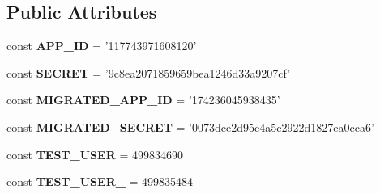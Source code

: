 \subsection*{Public Attributes}
\begin{DoxyCompactItemize}
\item 
\hypertarget{classPHPSDKTestCase_a42953a934e7fe71b3071c2776d9df949}{const {\bfseries A\-P\-P\-\_\-\-I\-D} = '117743971608120'}\label{classPHPSDKTestCase_a42953a934e7fe71b3071c2776d9df949}

\item 
\hypertarget{classPHPSDKTestCase_a2e31ccc7c2b15ed269966d301045f040}{const {\bfseries S\-E\-C\-R\-E\-T} = '9c8ea2071859659bea1246d33a9207cf'}\label{classPHPSDKTestCase_a2e31ccc7c2b15ed269966d301045f040}

\item 
\hypertarget{classPHPSDKTestCase_aeec98b2a076ae4d7022eb3c4eb955992}{const {\bfseries M\-I\-G\-R\-A\-T\-E\-D\-\_\-\-A\-P\-P\-\_\-\-I\-D} = '174236045938435'}\label{classPHPSDKTestCase_aeec98b2a076ae4d7022eb3c4eb955992}

\item 
\hypertarget{classPHPSDKTestCase_ae8b651bf891ad8f60089036e736fe273}{const {\bfseries M\-I\-G\-R\-A\-T\-E\-D\-\_\-\-S\-E\-C\-R\-E\-T} = '0073dce2d95c4a5c2922d1827ea0cca6'}\label{classPHPSDKTestCase_ae8b651bf891ad8f60089036e736fe273}

\item 
\hypertarget{classPHPSDKTestCase_a2c481b98610ac29143ea71b21fdd9be2}{const {\bfseries T\-E\-S\-T\-\_\-\-U\-S\-E\-R} = 499834690}\label{classPHPSDKTestCase_a2c481b98610ac29143ea71b21fdd9be2}

\item 
\hypertarget{classPHPSDKTestCase_a2e11b440e39fffa39d0057b73cf32857}{const {\bfseries T\-E\-S\-T\-\_\-\-U\-S\-E\-R\-\_} = 499835484}\label{classPHPSDKTestCase_a2e11b440e39fffa39d0057b73cf32857}

\end{DoxyCompactItemize}
